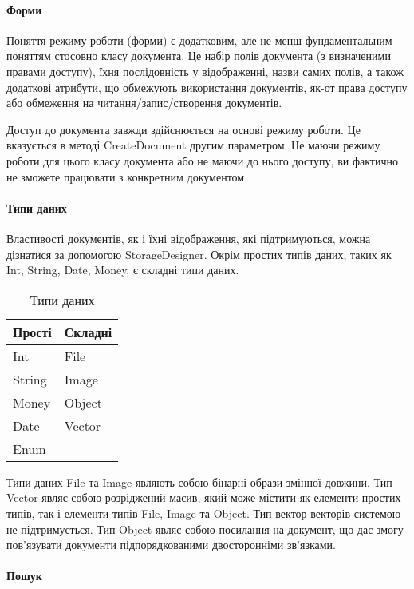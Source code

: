 \documentclass{memoir}
\begin{document}
\paragraph{Форми}

Поняття режиму роботи (форми) є додатковим, але не менш фундаментальним поняттям стосовно класу документа. Це набір полів документа (з визначеними правами доступу), їхня послідовність у відображенні, назви самих полів, а також додаткові атрибути, що обмежують використання документів, як-от права доступу або обмеження на читання/запис/створення документів.

Доступ до документа завжди здійснюється на основі режиму роботи. Це вказується в методі CreateDocument другим параметром. Не маючи режиму роботи для цього класу документа або не маючи до нього доступу, ви фактично не зможете працювати з конкретним документом.

\paragraph{Типи даних}

Властивості документів, як і їхні відображення, які підтримуються, можна дізнатися за допомогою StorageDesigner. Окрім простих типів даних, таких як Int, String, Date, Money, є складні типи даних.

\begin{table}[h]
    \centering
    \caption{Типи даних}
    \label{tab:data_types}
    \begin{tabular}{ll}
        \toprule
        Прості & Складні \\
        \midrule
        Int & File \\
        String & Image \\
        Money & Object \\
        Date & Vector \\
        Enum & \\
        \bottomrule
    \end{tabular}
\end{table}

Типи даних File та Image являють собою бінарні образи змінної довжини. Тип Vector являє собою розріджений масив, який може містити як елементи простих типів, так і елементи типів File, Image та Object. Тип вектор векторів системою не підтримується. Тип Object являє собою посилання на документ, що дає змогу пов’язувати документи підпорядкованими двосторонніми зв’язками.

\paragraph{Пошук}
\end{document}
